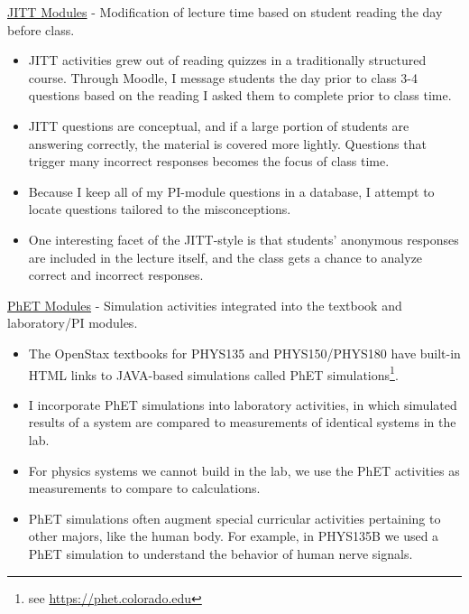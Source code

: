 \documentclass[../../../main.tex]{subfiles}
\begin{document}
\underline{JITT Modules} - Modification of lecture time based on student reading the day before class.
\begin{itemize}
\item JITT activities grew out of reading quizzes in a traditionally structured course.  Through Moodle, I message students the day prior to class 3-4 questions based on the reading I asked them to complete prior to class time.
\item JITT questions are conceptual, and if a large portion of students are answering correctly, the material is covered more lightly.  Questions that trigger many incorrect responses becomes the focus of class time.
\item Because I keep all of my PI-module questions in a database, I attempt to locate questions tailored to the misconceptions.
\item One interesting facet of the JITT-style is that students' anonymous responses are included in the lecture itself, and the class gets a chance to analyze correct and incorrect responses.
\end{itemize}

\underline{PhET Modules} - Simulation activities integrated into the textbook and laboratory/PI modules.
\begin{itemize}
\item The OpenStax textbooks for PHYS135 and PHYS150/PHYS180 have built-in HTML links to JAVA-based simulations called PhET simulations\footnote{see \url{https://phet.colorado.edu}}.
\item I incorporate PhET simulations into laboratory activities, in which simulated results of a system are compared to measurements of identical systems in the lab.
\item For physics systems we cannot build in the lab, we use the PhET activities as measurements to compare to calculations.
\item PhET simulations often augment special curricular activities pertaining to other majors, like the human body.  For example, in PHYS135B we used a PhET simulation to understand the behavior of human nerve signals.
\end{itemize}
\end{document}
